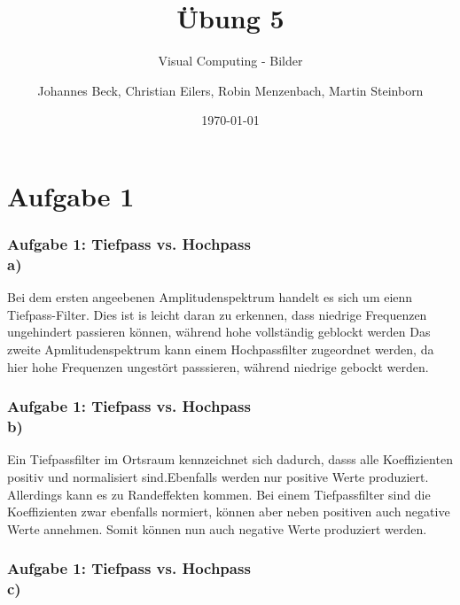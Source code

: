 \documentclass[accentcolor=tud1a,colorbacktitle,inverttitle,landscape,german,presentation,t]{tudbeamer}
\begin{document}
\title{\"Ubung 5}
\subtitle{Visual Computing - Bilder}

\author[Johannes Beck, Christian Eilers, Robin Menzenbach, Martin Steinborn]{Johannes Beck, Christian Eilers, Robin Menzenbach, Martin Steinborn}



\date{\today}

\begin{titleframe}
\end{titleframe}

\section{Aufgabe 1}
	\begin{frame}
		\frametitle{Aufgabe 1: Tiefpass vs. Hochpass \\ a)}
		Bei dem ersten angeebenen Amplitudenspektrum handelt es sich um eienn Tiefpass-Filter. Dies ist is leicht daran zu erkennen, dass niedrige Frequenzen ungehindert passieren können, während hohe vollständig geblockt werden
		Das zweite Apmlitudenspektrum kann einem Hochpassfilter zugeordnet werden, da hier hohe Frequenzen ungestört passsieren, während niedrige gebockt werden.
	\end{frame}
	
	\begin{frame}
	\frametitle{Aufgabe 1: Tiefpass vs. Hochpass \\ b)}
	Ein Tiefpassfilter im Ortsraum kennzeichnet sich dadurch, dasss alle Koeffizienten positiv und normalisiert sind.Ebenfalls werden nur positive Werte produziert. Allerdings kann es zu Randeffekten kommen. %
	Bei einem Tiefpassfilter sind die Koeffizienten zwar ebenfalls normiert, können aber neben positiven auch negative Werte annehmen. Somit können nun auch negative Werte produziert werden. %
	
	\end{frame}

	\begin{frame}
	\frametitle{Aufgabe 1: Tiefpass vs. Hochpass \\ c)}
	
	\end{frame}
\end{document}
